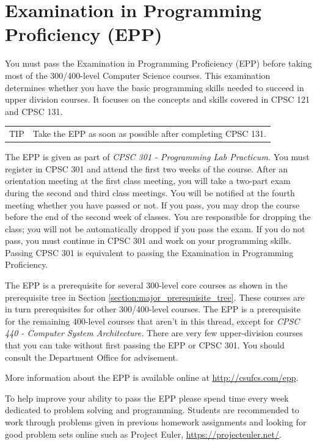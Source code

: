 \documentclass{book}
\newenvironment{tip}{
  \tcolorbox \begin{tabular}{m{.5in} m{5.25in}}
    \Large{TIP} &
}{
  \end{tabular} \endtcolorbox
}
\newcommand{\shrunkurl}[1]{\url{http://csufcs.com/#1}}
\begin{document}
\section{Examination in Programming Proficiency (EPP)}
 You must pass the
Examination in Programming Proficiency (EPP) before taking most of the
300/400-level Computer Science courses. This examination determines
whether you have the basic programming skills needed to succeed in
upper division courses. It focuses on the concepts and skills covered
in CPSC 121 and CPSC 131.

\begin{tip}
  Take the EPP as soon as possible after completing CPSC 131.
\end{tip}

The EPP is given as part of \emph{CPSC 301 - Programming Lab
  Practicum.} You must register in CPSC 301 and attend the first two
weeks of the course. After an orientation meeting at the first class
meeting, you will take a two-part exam during the second and third
class meetings. You will be notified at the fourth meeting whether you
have passed or not. If you pass, you may drop the course before the
end of the second week of classes. You are responsible for dropping
the class; you will not be automatically dropped if you pass the
exam. If you do not pass, you must continue in CPSC 301 and work on
your programming skills. Passing CPSC 301 is equivalent to passing the
Examination in Programming Proficiency.

The EPP is a prerequisite for several 300-level core courses as shown
in the prerequisite tree in Section
\ref{section:major_prerequisite_tree}. These courses are in turn
prerequisites for other 300/400-level courses. The EPP is a
prerequisite for the remaining 400-level courses that aren’t in this
thread, except for \emph{CPSC 440 - Computer System Architecture.}
There are very few upper-division courses that you can take without
first passing the EPP or CPSC 301. You should consult the Department
Office for advisement.

More information about the EPP is available online at \shrunkurl{epp}.

To help improve your ability to pass the EPP please spend time every
week dedicated to problem solving and programming. Students are
recommended to work through problems given in previous homework
assignments and looking for good problem sets online such as Project
Euler, \url{https://projecteuler.net/}.
\end{document}
